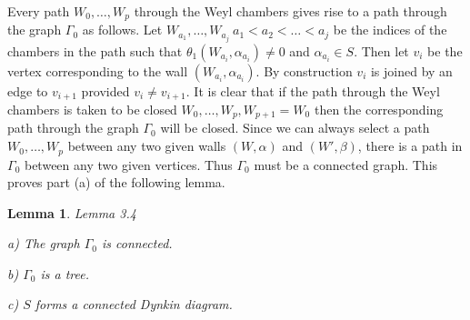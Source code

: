 \documentclass{memo-l}
\newtheorem{lemma}[theorem]{Lemma}
\theoremstyle{definition}
\theoremstyle{remark}
\numberwithin{section}{chapter}
\numberwithin{equation}{chapter}
\begin{document}
   Every path $W_{0},\ldots ,W_{p}$ through the Weyl chambers gives rise to
a path through the graph ${\Gamma}_{0}$ as follows.  Let $W_{a_1},\ldots ,
W_{a_j} \ a_{1} < a_{2} < \ldots < a_{j}$ be the indices of
the chambers in the path such that ${\theta}_{1}(W_{a_{i}},{\alpha}_{a_{i}})
\ne 0$ and ${\alpha}_{a_{i}}  \in  S$.  Then
let $v_{i}$ be the vertex corresponding to the wall $(W_{a_{i}},
{\alpha}_{a_{i}})$.  By construction $v_{i}$ is joined by an edge
to $v_{i+1}$ provided $v_{i}\ne v_{i+1}$.  It is clear that if the path
through the Weyl chambers is taken to be closed $W_{0},\ldots ,
W_{p},W_{p+1} = W_{0}$ then the corresponding path through the graph
${\Gamma}_{0}$ will be closed.  Since we can always select a path
$W_{0},\ldots ,W_{p}$ between any two given walls $(W,{\alpha})$ and
$(W',{\beta})$, there is a path in ${\Gamma}_{0}$ between any two given
vertices.  Thus ${\Gamma}_{0}$ must be a connected graph.  This proves part
(a) of the following lemma.

\medskip

\begin{lemma}{Lemma 3.4}   

\noindent
a)   The graph ${\Gamma}_{0}$ is connected.

\noindent
b)   ${\Gamma}_{0}$ is a tree.

\noindent
c)   $S$ forms a connected Dynkin diagram.
\end{lemma}

\medskip
\end{document}
